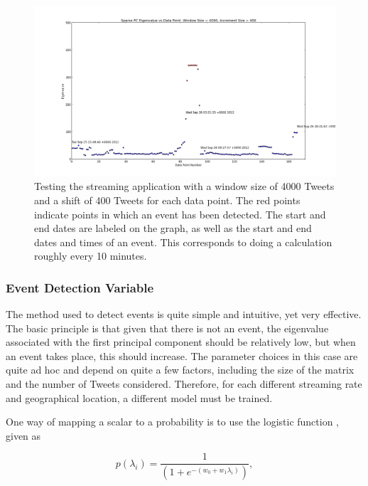 \documentclass[11pt,a4paper]{article}
\begin{document}
\begin{figure}[H]
\centering
\includegraphics[scale=0.25]{Testing_Streaming_App_4000_400.png}
\caption{Testing the streaming application with a window size of 4000 Tweets and a shift of 400 Tweets for each data point. The red points indicate points in which an event has been detected. The start and end dates are labeled on the graph, as well as the start and end dates and times of an event. This corresponds to doing a calculation roughly every  10 minutes.}
\label{testing_app_4000}
\end{figure}

\subsubsection{Event Detection Variable}
\label{event_detection}

The method used to detect events is quite simple and intuitive, yet very effective. The basic principle is that given that there is not an event, the eigenvalue associated with the first principal component should be relatively low, but when an event takes place, this should increase. The parameter choices in this case are quite ad hoc and depend on quite a few factors, including the size of the matrix and the number of Tweets considered. Therefore, for each different streaming rate and geographical location, a different model must be trained. 

One way of mapping a scalar to a probability is to use the logistic function \cite{bishop}, given as

\begin{equation}
p(\lambda_i)= \frac{1}{\left( 1 + e^{-(w_0 + w_1\lambda_i)}\right)},
\label{logit}
\end{equation}
\end{document}

